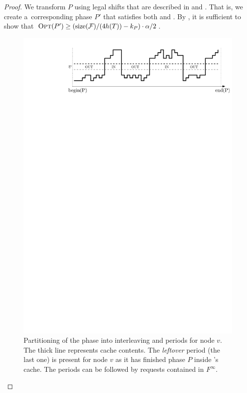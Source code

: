 \begin{proof}
We transform $P$ using legal shifts that are described in 
 and
. That is, we create a~corresponding
phase $P'$ that satisfies both
 and
. 
By , it is sufficient to show that
$\textsc{Opt}(P') \geq (\textrm{size}(\mathcal{F}) / (4 h(T)) - k_P) \cdot \alpha/2$.

\begin{figure}[t]
\centering
\includegraphics[width=0.9\columnwidth,keepaspectratio]{figs/cache-management/leftover}
\caption{Partitioning of the phase into interleaving \pin and \pout periods
for node $v$. The thick line represents cache contents. The \emph{leftover}
\pout period (the last one) is present for node $v$ as it has finished phase
$P$ inside \ALGTC's cache. The periods can be followed by requests contained in
$F^\infty$.}
\label{fig:leftover}
\end{figure}


\end{proof}
